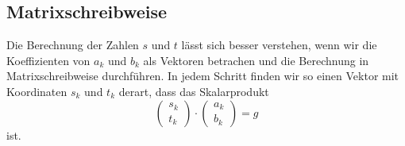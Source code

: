 \subsection{Matrixschreibweise}
Die Berechnung der Zahlen $s$ und $t$ lässt sich besser verstehen, wenn
wir die Koeffizienten von $a_k$ und $b_k$ als Vektoren betrachen und
die Berechnung in Matrixschreibweise durchführen.
In jedem Schritt finden wir so einen Vektor mit Koordinaten $s_k$ und $t_k$
derart, dass das Skalarprodukt
\[
\begin{pmatrix}s_k\\t_k \end{pmatrix}
\cdot
\begin{pmatrix}a_k\\b_k \end{pmatrix}
=
g
\]
ist.

